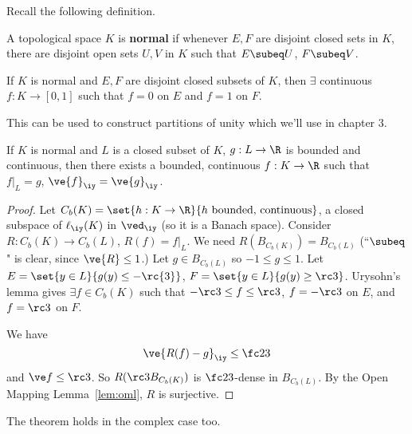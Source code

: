 Recall the following definition.
\begin{df}
A topological space $K$ is \textbf{normal} if whenever $E,F$ are disjoint closed sets in $K$, there are disjoint open sets $U,V$ in $K$ such that $E\subeq U$, $F\subeq V$. 
\end{df}
\begin{lem}
If $K$ is normal and $E,F$ are disjoint closed subsets of $K$, then $\exists$ continuous $f:K\to [0,1]$ such that $f=0$ on $E$ and $f=1$ on $F$.
\end{lem}
This can be used to construct partitions of unity which we'll use in chapter 3.
\begin{thm}
If $K$ is normal and $L$ is a closed subset of $K$, $g:L\to \R$ is bounded and continuous, then there exists a bounded, continuous $f:K\to \R$ such that $f|_L=g$, $\ve{f}_{\iy}=\ve{g}_{\iy}$. 
\end{thm}
\begin{proof}
Let $C_b(K)=\set{h:K\to \R}{h\text{ bounded, continuous}}$, a closed subspace of $\ell_{\iy}(K)$ in $\ved_{\iy}$ (so it is a Banach space). Consider $R:C_b(K)\to C_b(L)$, $R(f)=f|_L$. We need $R(B_{C_b(K)})=B_{C_b(L)}$ (``$\subeq$" is clear, since $\ve{R}\le 1$.) Let $g\in B_{C_b(L)}$ so $-1\le g\le 1$. Let $E=\set{y\in L}{g(y)\le -\rc{3}}$, $F=\set{y\in L}{g(y)\ge \rc 3}$. Urysohn's lemma gives $\exists f\in C_b(K)$ such that $-\rc 3\le f\le \rc 3$, $f=-\rc 3$ on $E$, and $f=\rc 3$ on $F$.

We have
\[
\ve{R(f)-g}_{\iy} \le \fc23 
\]
and $\ve f\le \rc 3$. So $R(\rc 3B_{C_b(K)})$ is $\fc 23$-dense in $B_{C_b(L)}$. By the Open Mapping Lemma~\ref{lem:oml}, $R$ is surjective.
\end{proof}
\begin{rem}
The theorem holds in the complex case too.
\end{rem}


